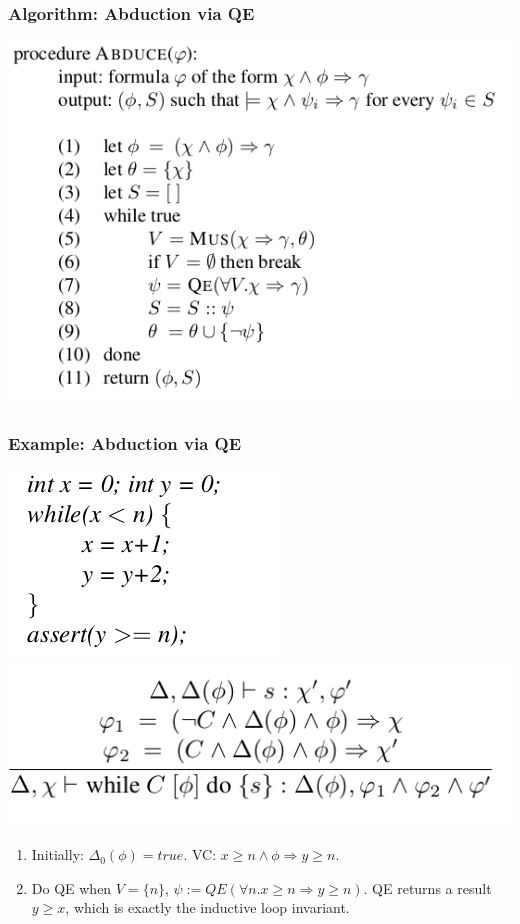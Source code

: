 \documentclass[11pt]{beamer}
\begin{document}
\begin{frame}\frametitle{Algorithm: Abduction via QE}

\begin{center}
\includegraphics[scale=0.4]{abduce.png}
\end{center}
\end{frame}

\begin{frame}\frametitle{Example: Abduction via QE}
\begin{multicols}{2}

\begin{center}
\includegraphics[scale=0.3]{diverge.png}
\includegraphics[scale=0.3]{loop.png}
\end{center}

\begin{enumerate}
\item Initially: $\Delta_0(\phi) = true$. VC: $x \ge n \wedge \phi \Rightarrow y\ge n$.
\item Do QE when $V = \{n\}$, $\psi := QE(\forall n. x \ge n \Rightarrow y\ge n)$. QE returns a result $y \ge x$, which is exactly the inductive loop invariant.

\end{enumerate}

\end{multicols}
\end{frame}
\end{document}

